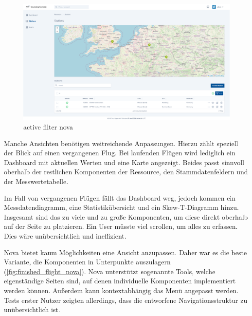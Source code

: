 \begin{figure}[h!]
    \centering
    \caption{active filter nova}
    \label{fig:active_filter_nova}
    \includegraphics[scale=0.23]{assets/active_filter_nova}
\end{figure}

\newpage

Manche Ansichten benötigen weitreichende Anpassungen.
Hierzu zählt speziell der Blick auf einen vergangenen Flug.
Bei laufenden Flügen wird lediglich ein Dashboard mit aktuellen Werten und eine Karte angezeigt.
Beides passt sinnvoll oberhalb der restlichen Komponenten der Ressource, den Stammdatenfeldern und der Messwertetabelle.

Im Fall von vergangenen Flügen fällt das Dashboard weg, jedoch kommen ein Messdatendiagramm, eine Statistikübersicht und ein Skew-T-Diagramm hinzu.
Insgesamt sind das zu viele und zu große Komponenten, um diese direkt oberhalb auf der Seite zu platzieren.
Ein User müsste viel scrollen, um alles zu erfassen.
Dies wäre unübersichtlich und ineffizient.

Nova bietet kaum Möglichkeiten eine Ansicht anzupassen.
Daher war es die beste Variante, die Komponenten in Unterpunkte auszulagern (\ref{fig:finished_flight_nova}).
Nova unterstützt sogenannte Tools, welche eigenständige Seiten sind, auf denen individuelle Komponenten implementiert werden können.
Außerdem kann kontextabhängig das Menü angepasst werden.
Tests erster Nutzer zeigten allerdings, dass die entworfene Navigationsstruktur zu unübersichtlich ist.

\newpage

